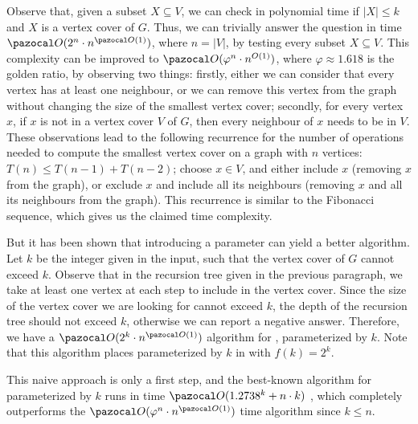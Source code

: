 Observe that, given a subset $X \subseteq V$, we can check in polynomial time if $|X| \leq k$ and $X$ is a vertex cover of $G$. Thus, we can trivially answer the question in time $\O(2^n \cdot n^{\O(1)})$, where $n = |V|$, by testing every subset $X \subseteq V$. This complexity can be improved to $\O(\varphi^n \cdot n^{O(1)})$, where $\varphi \approx 1.618$ is the golden ratio, by observing two things: firstly, either we can consider that every vertex has at least one neighbour, or we can remove this vertex from the graph without changing the size of the smallest vertex cover; secondly, for every vertex $x$, if $x$ is not in a vertex cover $V$ of $G$, then every neighbour of $x$ needs to be in $V$. These observations lead to the following recurrence for the number of operations needed to compute the smallest vertex cover on a graph with $n$ vertices: $T(n) \leq T(n - 1) + T(n - 2)$; choose $x \in V$, and either include $x$ (removing $x$ from the graph), or exclude $x$ and include all its neighbours (removing $x$ and all its neighbours from the graph). This recurrence is similar to the Fibonacci sequence, which gives us the claimed time complexity.

\medskip

But it has been shown that introducing a parameter can yield a better algorithm. Let $k$ be the integer given in the input, such that the vertex cover of $G$ cannot exceed $k$. Observe that in the recursion tree given in the previous paragraph, we take at least one vertex at each step to include in the vertex cover. Since the size of the vertex cover we are looking for cannot exceed $k$, the depth of the recursion tree should not exceed $k$, otherwise we can report a negative answer. Therefore, we have a $\O(2^k \cdot n^{\O(1)})$ algorithm for , parameterized by $k$. Note that this algorithm places  parameterized by $k$ in  with $f(k) = 2^k$.

This naive approach is only a first step, and the best-known algorithm for  parameterized by $k$ runs in time $\O(1.2738^k + n\cdot k)$ \cite{chen2006improved}, which completely outperforms the $\O(\varphi^n \cdot n^{\O(1)})$ time algorithm since $k \leq n$.


